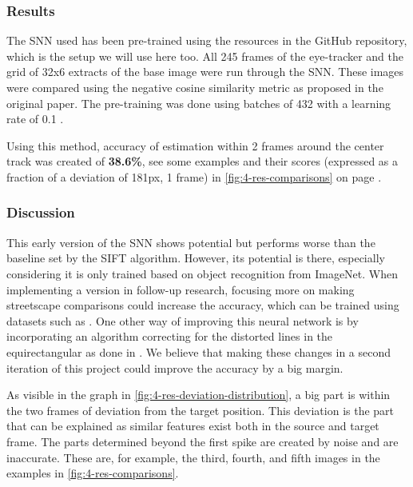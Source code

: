 \documentclass[sigconf, natbib=false, nonacm]{acmart}
\begin{document}
        \subsubsection{Results}
        The SNN used has been pre-trained using the resources in the GitHub repository, which is the setup we will use here too. All 245 frames of the eye-tracker and the grid of 32x6 extracts of the base image were run through the SNN. These images were compared using the negative cosine similarity metric as proposed in the original paper. The pre-training was done using batches of 432 with a learning rate of 0.1 \cite{Chen2020a}.
        
        Using this method, accuracy of estimation within 2 frames around the center track was created of \textbf{38.6\%}, see some examples and their scores (expressed as a fraction of a deviation of 181px, 1 frame) in \autoref{fig:4-res-comparisons} on page \pageref{fig:4-res-comparisons}.
    
        \subsubsection{Discussion}
        This early version of the SNN shows potential but performs worse than the baseline set by the SIFT algorithm. However, its potential is there, especially considering it is only trained based on object recognition from ImageNet. When implementing a version in follow-up research, focusing more on making streetscape comparisons could increase the accuracy, which can be trained using datasets such as \cite{Cordts2016TheUnderstanding}. One other way of improving this neural network is by incorporating an algorithm correcting for the distorted lines in the equirectangular as done in \cite{Deng2017}. We believe that making these changes in a second iteration of this project could improve the accuracy by a big margin. 
        
        As visible in the graph in \autoref{fig:4-res-deviation-distribution}, a big part is within the two frames of deviation from the target position. This deviation is the part that can be explained as similar features exist both in the source and target frame. The parts determined beyond the first spike are created by noise and are inaccurate. These are, for example, the third, fourth, and fifth images in the examples in \autoref{fig:4-res-comparisons}.
        
\end{document}
